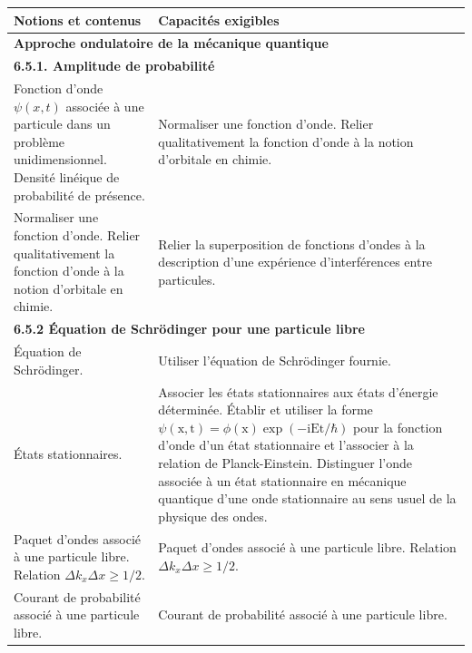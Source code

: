 {\scriptsize
        \begin{tabularx}{\textwidth}{|p{}|X|}
            \hline 
            \textbf{Notions et contenus} & \textbf{Capacités exigibles} \\
            \hline 
            \multicolumn{2}{|l|}{\textbf{Approche ondulatoire de la mécanique quantique}} \\
            \hline
            \multicolumn{2}{|l|}{\textbf{6.5.1. Amplitude de probabilité}} \\
            \hline
            Fonction d'onde $\psi(x, t)$ associée à une particule dans un problème unidimensionnel. Densité linéique de probabilité de présence.  & 
            Normaliser une fonction d'onde. Relier qualitativement la fonction d'onde à la notion d'orbitale en chimie. \\
            \hline 
            Normaliser une fonction d'onde. Relier qualitativement la fonction d'onde à la notion d'orbitale en chimie.   & 
            Relier la superposition de fonctions d'ondes à la description d'une expérience d'interférences entre particules. \\
        \hline 
        \multicolumn{2}{|l|}{\textbf{6.5.2 Équation de Schrödinger pour une particule libre}} \\
        \hline    
        Équation de Schrödinger. & 
        Utiliser l'équation de Schrödinger fournie. \\
        \hline
         États stationnaires. &
        Associer les états stationnaires aux états d'énergie déterminée. Établir et utiliser la forme $\psi(\mathrm{x}, \mathrm{t})=\phi(\mathrm{x}) \exp (-\mathrm{iEt} / \hbar)$ pour la fonction d'onde d'un état stationnaire et l'associer à la relation de Planck-Einstein.
Distinguer l'onde associée à un état stationnaire en mécanique quantique d'une onde stationnaire au sens usuel de la physique des ondes.\\
        \hline
        Paquet d'ondes associé à une particule libre. Relation $\Delta k_x \Delta x \geq 1 / 2$. & Paquet d'ondes associé à une particule libre. Relation $\Delta k_x \Delta x \geq 1 / 2$. \\
        \hline
        Courant de probabilité associé à une particule libre. &
        Courant de probabilité associé à une particule libre. \\
        \hline
        \end{tabularx}
\vspace{0.5cm}
}
